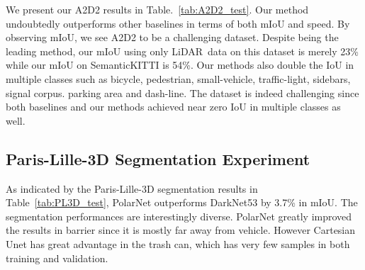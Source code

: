 \documentclass[10pt,twocolumn,letterpaper]{article}
\newcommand{\lidar}{\mbox{LiDAR }}
\begin{document}
We present our A2D2 results in Table.~\ref{tab:A2D2_test}. Our method undoubtedly outperforms other baselines in terms of both mIoU and speed. By observing mIoU, we see A2D2 to be a challenging dataset. Despite being the leading method, our mIoU using only \lidar data on this dataset is merely 23\% while our mIoU on SemanticKITTI is 54\%. Our methods also double the IoU in multiple classes such as bicycle, pedestrian, small-vehicle, traffic-light, sidebars, signal corpus. parking area and dash-line. The dataset is indeed challenging since both baselines and our methods achieved near zero IoU in multiple classes as well.

\subsection{Paris-Lille-3D Segmentation Experiment}

As indicated by the Paris-Lille-3D segmentation results in Table~\ref{tab:PL3D_test}, PolarNet outperforms DarkNet53 by 3.7\% in mIoU. The segmentation performances are interestingly diverse. PolarNet greatly improved the results in barrier since it is mostly far away from vehicle. However Cartesian Unet has great advantage in the trash can, which has very few samples in both training and validation.

\begin{table}
	\centering
	\caption{Segmentation results on \textbf{test} split of Paris-Lille-3D.}
	\vspace{0pt}
	\label{tab:PL3D_test}
\vspace{-3pt}
\end{table}
\end{document}
